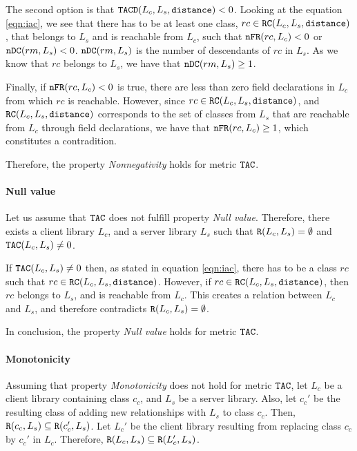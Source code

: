 The second option is that $\verb|TACD|(L_c,L_s, \verb|distance|) < 0$. Looking at the equation \ref{eqn:iac}, we see that there has to be at least one class, $rc \in \verb|RC|(L_c,L_s,\verb|distance|)$, that belongs to $L_s$ and is reachable from $L_c$, such that $\verb|nFR|(rc,L_c) < 0$ or $\verb|nDC|(rm, L_s) < 0$. $\verb|nDC|(rm, L_s)$ is the number of descendants of $rc$ in $L_s$. As we know that $rc$ belongs to $L_s$, we have that $\verb|nDC|(rm, L_s) \geq 1$.

Finally, if $\verb|nFR|(rc,L_c) < 0$ is true, there are less than zero field declarations in $L_c$ from which $rc$ is reachable. However, since $rc \in \verb|RC|(L_c,L_s,\verb|distance|)$, and $\verb|RC|(L_c,L_s,\verb|distance|)$ corresponds to the set of classes from $L_s$ that are reachable from $L_c$ through field declarations, we have that $\verb|nFR|(rc,L_c) \geq 1$, which constitutes a contradition.

Therefore, the property \textit{Nonnegativity} holds for metric $\verb|TAC|$.

\paragraph{Null value}
Let us assume that $\verb|TAC|$ does not fulfill property \textit{Null value}. Therefore, there exists a client library $L_c$, and a server library $L_s$ such that $\verb|R|(L_c, L_s) = \emptyset$ and $\verb|TAC|(L_c, L_s) \neq 0$.

If $\verb|TAC|(L_c, L_s) \neq 0$ then, as stated in equation \ref{eqn:iac}, there has to be a class $rc$ such that  $rc \in \verb|RC|(L_c,L_s,\verb|distance|)$. However, if $rc \in \verb|RC|(L_c,L_s,\verb|distance|)$, then $rc$ belongs to $L_s$, and is reachable from $L_c$. This creates a relation between $L_c$ and $L_s$, and therefore contradicts $\verb|R|(L_c, L_s) = \emptyset$.

In conclusion, the property \textit{Null value} holds for metric $\verb|TAC|$.

\paragraph{Monotonicity}
Assuming that property \textit{Monotonicity} does not hold for metric $\verb|TAC|$, let $L_c$ be a client library containing class $c_c$, and $L_s$ be a server library. Also, let $c_c'$ be the resulting class of adding new relationships with $L_s$ to class $c_c$. Then, $\verb|R|(c_c, L_s) \subseteq \verb|R|(c_c', L_s)$. Let $L_c'$ be the client library resulting from replacing class $c_c$ by $c_c'$ in $L_c$. Therefore, $\verb|R|(L_c, L_s) \subseteq \verb|R|(L_c', L_s)$.

